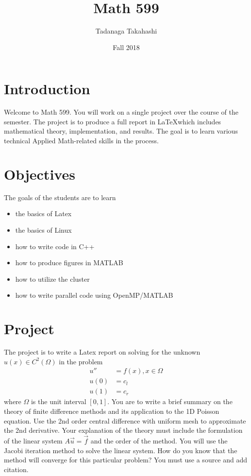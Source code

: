\documentclass{article}
\title{Math 599}
\author{Tadanaga Takahashi}
\date{Fall 2018}
\begin{document}
\maketitle

\section{Introduction}

Welcome to Math 599. You will work on a single project over the course of the semester. The project is to produce a full report in \LaTeX which includes mathematical theory, implementation, and results. The goal is to learn various technical Applied Math-related skills in the process.

\section{Objectives}

The goals of the students are to learn
\begin{itemize}
    \item the basics of Latex
    \item the basics of Linux
    \item how to write code in C++
    \item how to produce figures in MATLAB
    \item how to utilize the cluster
    \item how to write parallel code using OpenMP/MATLAB
\end{itemize}

\section{Project}

The project is to write a Latex report on solving for the unknown $u(x) \in C^2(\Omega)$ in the problem
\begin{align}
u'' &= f(x), x \in \Omega \\
u(0)&=c_l \\
u(1)&=c_r
\end{align}
where $\Omega$ is the unit interval $[0,1]$. You are to write a brief summary on the theory of finite difference methods and its application to the 1D Poisson equation. Use the 2nd order central difference with uniform mesh to approximate the 2nd derivative. Your explanation of the theory must include the formulation of the linear system $A\Vec{u}=\Vec{f}$ and the order of the method. You will use the Jacobi iteration method to solve the linear system. How do you know that the method will converge for this particular problem? You must use a source and add citation.
\end{document}
